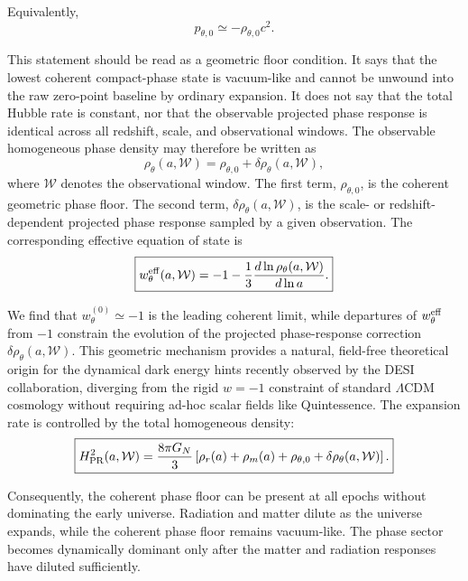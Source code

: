\documentclass[11pt]{article}
\begin{document}
Equivalently,
\begin{equation}
p_{\theta,0}
\simeq
-\rho_{\theta,0}c^2.
\end{equation}

This statement should be read as a geometric floor condition. It says that the lowest coherent compact-phase state is vacuum-like and cannot be unwound into the raw zero-point baseline by ordinary expansion. It does not say that the total Hubble rate is constant, nor that the observable projected phase response is identical across all redshift, scale, and observational windows. The observable homogeneous phase density may therefore be written as
\begin{equation}
\boxed{
\rho_\theta(a,\mathcal W)
=
\rho_{\theta,0}
+
\delta\rho_\theta(a,\mathcal W),
}
\end{equation}
where \(\mathcal W\) denotes the observational window. The first term, \(\rho_{\theta,0}\), is the coherent geometric phase floor. The second term, \(\delta\rho_\theta(a,\mathcal W)\), is the scale- or redshift-dependent projected phase response sampled by a given observation. The corresponding effective equation of state is
\begin{equation}
\boxed{
w_\theta^{\rm eff}(a,\mathcal W)
=
-1
-
\frac{1}{3}
\frac{d\ln\rho_\theta(a,\mathcal W)}{d\ln a}.
}
\end{equation}

We find that \(w_\theta^{(0)}\simeq -1\) is the leading coherent limit, while departures of \(w_\theta^{\rm eff}\) from \(-1\) constrain the evolution of the projected phase-response correction \(\delta\rho_\theta(a,\mathcal W)\). This geometric mechanism provides a natural, field-free theoretical origin for the dynamical dark energy hints recently observed by the DESI \cite{Adame2024DESI} collaboration, diverging from the rigid $w = -1$ constraint of standard $\Lambda$CDM cosmology without requiring ad-hoc scalar fields like Quintessence. The expansion rate is controlled by the total homogeneous density:
\begin{equation}
\boxed{
H_{\rm PR}^{2}(a,\mathcal W)
=
\frac{8\pi G_N}{3}
\left[
\rho_r(a)
+
\rho_m(a)
+
\rho_{\theta,0}
+
\delta\rho_\theta(a,\mathcal W)
\right].
}
\end{equation}

Consequently, the coherent phase floor can be present at all epochs without dominating the early universe. Radiation and matter dilute as the universe expands, while the coherent phase floor remains vacuum-like. The phase sector becomes dynamically dominant only after the matter and radiation responses have diluted sufficiently.
\end{document}
